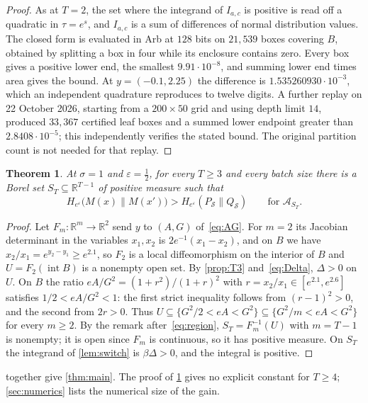 \documentclass[11pt]{amsart}
\newtheorem{theorem}{Theorem}[section]
\theoremstyle{definition}
\theoremstyle{remark}
\newcommand{\R}{\mathbb R}
\newcommand{\He}{H_{e^{\varepsilon}}}
\begin{document}
\begin{proof}
As at $T=2$, the set where the integrand of $I_{a,c}$ is positive is read off a quadratic in $\tau=e^{s}$, and $I_{a,c}$ is a sum of differences of normal distribution values. The closed form is evaluated in Arb at $128$ bits on $21{,}539$ boxes covering $B$, obtained by splitting a box in four while its enclosure contains zero. Every box gives a positive lower end, the smallest $9.91\cdot10^{-8}$, and summing lower end times area gives the bound. At $y=(-0.1,2.25)$ the difference is $1.535260930\cdot10^{-3}$, which an independent quadrature reproduces to twelve digits. A further replay on 22 October 2026, starting from a $200\times50$ grid and using depth limit $14$, produced $33{,}367$ certified leaf boxes and a summed lower endpoint greater than $2.8408\cdot10^{-5}$; this independently verifies the stated bound. The original partition count is not needed for that replay.
\end{proof}

\begin{theorem}\label{thm:allT}
At $\sigma=1$ and $\varepsilon=\frac12$, for every $T\ge3$ and every batch size there is a Borel set $S_T\subseteq\R^{T-1}$ of positive measure such that
\[
\He\bigl(M(x)\|M(x')\bigr)>\He(P_{\mathcal S}\|Q_{\mathcal S})\qquad\text{for }\mathcal A_{S_T}.
\]
\end{theorem}

\begin{proof}
Let $F_m\colon\R^m\to\R^2$ send $y$ to $(A,G)$ of~\eqref{eq:AG}. For $m=2$ its Jacobian determinant in the variables $x_1,x_2$ is $2e^{-1}(x_1-x_2)$, and on $B$ we have $x_2/x_1=e^{y_2-y_1}\ge e^{2.1}$, so $F_2$ is a local diffeomorphism on the interior of $B$ and $U=F_2(\operatorname{int}B)$ is a nonempty open set. By \cref{prop:T3} and~\eqref{eq:Delta}, $\Delta>0$ on $U$. On $B$ the ratio $eA/G^2=(1+r^2)/(1+r)^2$ with $r=x_2/x_1\in[e^{2.1},e^{2.6}]$ satisfies $1/2<eA/G^2<1$: the first strict inequality follows from $(r-1)^2>0$, and the second from $2r>0$. Thus $U\subseteq\{G^2/2<eA<G^2\}\subseteq\{G^2/m<eA<G^2\}$ for every $m\ge2$. By the remark after~\eqref{eq:region}, $S_T=F_m^{-1}(U)$ with $m=T-1$ is nonempty; it is open since $F_m$ is continuous, so it has positive measure. On $S_T$ the integrand of \cref{lem:switch} is $\beta\Delta>0$, and the integral is positive.
\end{proof}

 together give \cref{thm:main}. The proof of \cref{thm:allT} gives no explicit constant for $T\ge4$; \cref{sec:numerics} lists the numerical size of the gain.
\end{document}
